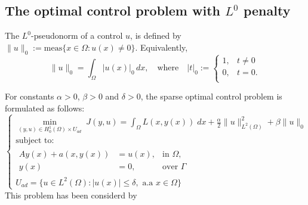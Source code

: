 \documentclass[11pt,a4paper]{amsart}
\newcommand{\om}{\Omega}
\newcommand{\norm}[1]{\lVert #1 \rVert}
\begin{document}
\subsection{The optimal control problem with $L^0$ penalty}
The $L^0$-pseudonorm of a control $u$, is defined by $\norm{u}_{0}:=\mbox{meas}\{x\in \om: u(x)\ne 0\}$. Equivalently, 
\[
\norm{u}_{0}= \int_\om |u(x)|_0 \,dx , \quad \text{where} \quad  |t|_0:=\begin{cases}    
    1,&t\ne 0\\
    0,&t=0.\\
\end{cases}
\]

For constants $\alpha>0$, $\beta>0$ and $\delta>0$, the sparse optimal control problem is formulated as follows:
\begin{equation}\label{eq:P}\tag{$P$}
    \begin{cases}
    \displaystyle\min_{(y,u)\in H_0^1(\om)\times U_{ad}}\; J(y,u)=\int_{\om}L(x,y(x))\; dx+\frac{\alpha}{2}\norm{u}^2_{L^2(\om)}+\beta \norm{u}_0\\
    \mbox{subject to:}\\
    \begin{array}{rll}
     Ay(x)+a(x,y(x))&=u(x), &\mbox{in } \om,\\
        y(x)&=0,  &\mbox{over } \Gamma  
     \end{array}\\
     U_{ad}=\{u\in L^2(\om): |u(x)|\le \delta, \text{ a.a }x\in \om\}
    \end{cases}
\end{equation}
This problem has been considerd by \cite{itokun2014}
\end{document}
